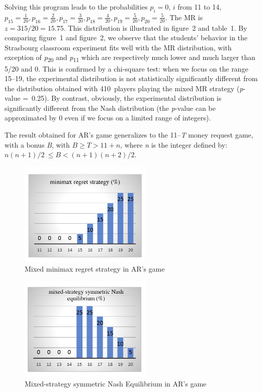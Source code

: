 \begin{Article}
\begin{refsection}[Umbhauer]
Solving this program leads to the probabilities $p_{i} = 0$, $i$ from 11 to 14, $p_{15} = \frac{1}{20}, p_{16} = \frac{2}{20}, p_{17} = \frac{3}{20}, p_{18} = \frac{4}{20}, p_{19} = \frac{5}{20}, p_{20} = \frac{5}{20}$. The MR is $z=315/20=15.75$. This distribution is illustrated in figure~2 and table~1. By comparing figure~1 and figure~2, we observe that the students' behavior in the Strasbourg classroom experiment fits well with the MR distribution, with exception of \emph{p}\textsubscript{20} and \emph{p}\textsubscript{11} which are respectively much lower and much larger than 5/20 and 0. This is confirmed by a chi-square test: when we focus on the range 15--19, the
experimental distribution is not statistically significantly different
from the distribution obtained with 410~players playing the mixed MR
strategy (\emph{p}-value =~0.25). By contrast, obviously, the
experimental distribution is significantly different from the Nash
distribution (the \emph{p}-value can be approximated by 0 even if we
focus on a limited range of integers).

The result obtained for AR's game generalizes to the 11--\emph{T} money
request game, with a bonus \emph{B}, with \(B \geq T > 11 + n\), where
\emph{n} is the integer defined by:
\(n(n + 1)/2\  \leq B < (n + 1)(n + 2)/2\).


\begin{figure}[h]
    \centering
    \caption{Mixed minimax regret strategy in AR's game}
    \includegraphics[height=5cm]{Articles-bons-a-composer/07_Umbhauer_en/07_Umbhauer_en_figures/Umbhauer_fig2.jpeg}
\end{figure}


\begin{figure}[h]
    \centering
    \caption{Mixed-strategy symmetric Nash Equilibrium in AR's game}
    \includegraphics[height=5cm]{Articles-bons-a-composer/07_Umbhauer_en/07_Umbhauer_en_figures/Umbhauer_fig3.jpeg}
\end{figure}


\end{refsection}
\end{Article}

